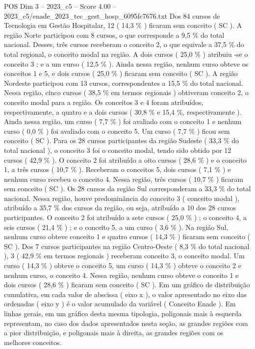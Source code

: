 \begin{textsample}{POS Dim 3 – 2023\_c5 – Score 4.00 – 2023\_c5/enade\_2023\_tec\_gest\_hosp\_6095fc7676.txt}
Dos 84 cursos de Tecnologia em Gestão Hospitalar, 12 ( 14,3 \% ) ficaram sem conceito ( SC ).
A região Norte participou com 8 cursos, o que corresponde a 9,5 \% do total nacional.
Desses, três cursos receberam o conceito 2, o que equivale a 37,5 \% do total regional, o conceito modal na região.
A dois cursos ( 25,0 \% ) atribuiu -se o conceito 3 ; e a um curso ( 12,5 \% ).
Ainda nessa região, nenhum curso obteve os conceitos 1 e 5, e dois cursos ( 25,0 \% ) ficaram sem conceito ( SC ).
A região Nordeste participou com 13 cursos, correspondentes a 15,5 \% do total nacional.
Nessa região, cinco cursos ( 38,5 \% em termos regionais ) obtiveram conceito 2, o conceito modal para a região.
Os conceitos 3 e 4 foram atribuídos, respectivamente, a quatro e a dois cursos ( 30,8 \% e 15,4 \%, respectivamente ).
Ainda nessa região, um curso ( 7,7 \% ) foi avaliado com o conceito 1 e nenhum curso ( 0,0 \% ) foi avaliado com o conceito 5.
Um curso ( 7,7 \% ) ficou sem conceito ( SC ).
Para os 28 cursos participantes da região Sudeste ( 33,3 \% do total nacional ), o conceito 3 foi o conceito modal, tendo sido obtido por 12 cursos ( 42,9 \% ).
O conceito 2 foi atribuído a oito cursos ( 28,6 \% ) e o conceito 1, a três cursos ( 10,7 \% ).
Receberam o conceitos 5, dois cursos ( 7,1 \% ) e nenhum curso recebeu o conceito 4.
Nessa região, três cursos ( 10,7 \% ) ficaram sem conceito ( SC ).
Os 28 cursos da região Sul corresponderam a 33,3 \% do total nacional.
Nessa região, houve predominância do conceito 3 ( conceito modal ), atribuído a 35,7 \% dos cursos da região, ou seja, atribuído a 10 dos 28 cursos participantes.
O conceito 2 foi atribuído a sete cursos ( 25,0 \% ) ; o conceito 4, a seis cursos ( 21,4 \% ) ; e o conceito 5, a um curso ( 3,6 \% ).
Na região Sul, nenhum curso obteve conceito 1 e quatro cursos ( 14,3 \% ) ficaram sem conceito ( SC ).
Dos 7 cursos participantes na região Centro-Oeste ( 8,3 \% do total nacional ), 3 ( 42,9 \% em termos regionais ) receberam conceito 3, o conceito modal.
Um curso ( 14,3 \% ) obteve o conceito 5, um curso ( 14,3 \% ) obteve o conceito 2 e nenhum curso, o conceito 4.
Nessa região, nenhum curso obteve o conceito 1 e dois cursos ( 28,6 \% ) ficaram sem conceito ( SC ).
Em um gráfico de distribuição cumulativa, em cada valor de abscissa ( eixo x ), o valor apresentado no eixo das ordenadas ( eixo y ) é o valor acumulado da variável ( Conceito Enade ).
Em linhas gerais, em um gráfico desta mesma tipologia, poligonais mais à esquerda representam, no caso dos dados apresentados nesta seção, as grandes regiões com a pior distribuição, e poligonais mais à direita, as grandes regiões com os melhores conceitos.

\end{textsample}
